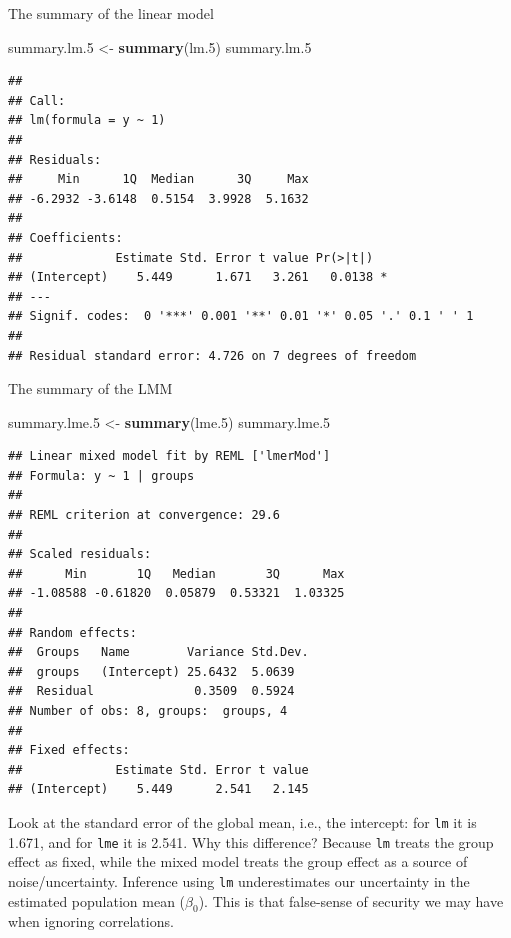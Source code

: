 \documentclass[]{book}
\newenvironment{Shaded}{\begin{snugshade}}{\end{snugshade}}
\newcommand{\FloatTok}[1]{\textcolor[rgb]{0.00,0.00,0.81}{#1}}
\newcommand{\KeywordTok}[1]{\textcolor[rgb]{0.13,0.29,0.53}{\textbf{#1}}}
\newcommand{\NormalTok}[1]{#1}
\newcommand{\StringTok}[1]{\textcolor[rgb]{0.31,0.60,0.02}{#1}}
\theoremstyle{definition}
\theoremstyle{definition}
\theoremstyle{definition}
\theoremstyle{remark}
\begin{document}
The summary of the linear model

\begin{Shaded}
\begin{Highlighting}[]
\NormalTok{summary.lm}\FloatTok{.5}\NormalTok{ <-}\StringTok{ }\KeywordTok{summary}\NormalTok{(lm}\FloatTok{.5}\NormalTok{)}
\NormalTok{summary.lm}\FloatTok{.5}
\end{Highlighting}
\end{Shaded}

\begin{verbatim}
## 
## Call:
## lm(formula = y ~ 1)
## 
## Residuals:
##     Min      1Q  Median      3Q     Max 
## -6.2932 -3.6148  0.5154  3.9928  5.1632 
## 
## Coefficients:
##             Estimate Std. Error t value Pr(>|t|)  
## (Intercept)    5.449      1.671   3.261   0.0138 *
## ---
## Signif. codes:  0 '***' 0.001 '**' 0.01 '*' 0.05 '.' 0.1 ' ' 1
## 
## Residual standard error: 4.726 on 7 degrees of freedom
\end{verbatim}

The summary of the LMM

\begin{Shaded}
\begin{Highlighting}[]
\NormalTok{summary.lme}\FloatTok{.5}\NormalTok{ <-}\StringTok{ }\KeywordTok{summary}\NormalTok{(lme}\FloatTok{.5}\NormalTok{)}
\NormalTok{summary.lme}\FloatTok{.5}
\end{Highlighting}
\end{Shaded}

\begin{verbatim}
## Linear mixed model fit by REML ['lmerMod']
## Formula: y ~ 1 | groups
## 
## REML criterion at convergence: 29.6
## 
## Scaled residuals: 
##      Min       1Q   Median       3Q      Max 
## -1.08588 -0.61820  0.05879  0.53321  1.03325 
## 
## Random effects:
##  Groups   Name        Variance Std.Dev.
##  groups   (Intercept) 25.6432  5.0639  
##  Residual              0.3509  0.5924  
## Number of obs: 8, groups:  groups, 4
## 
## Fixed effects:
##             Estimate Std. Error t value
## (Intercept)    5.449      2.541   2.145
\end{verbatim}

Look at the standard error of the global mean, i.e., the intercept:
for \texttt{lm} it is 1.671, and for \texttt{lme} it is 2.541.
Why this difference?
Because \texttt{lm} treats the group effect as fixed, while the mixed model treats the group effect as a source of noise/uncertainty.
Inference using \texttt{lm} underestimates our uncertainty in the estimated population mean (\(\beta_0\)).
This is that false-sense of security we may have when ignoring correlations.
\end{document}
